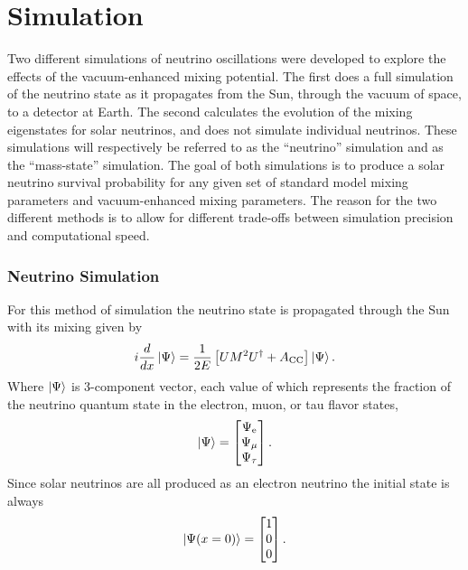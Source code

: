 \chapter{Simulation}
\label{sec:cham_sim}
Two different simulations of neutrino oscillations were developed to explore the
effects of the vacuum-enhanced mixing potential.
The first
does a full simulation of the neutrino state as it propagates from the
Sun, through the vacuum of space, to a detector at Earth.
The second calculates the evolution
of the mixing eigenstates for solar neutrinos, and does not simulate individual
neutrinos.
These simulations will respectively be referred to as the ``neutrino'' simulation
and as the ``mass-state'' simulation.
The goal of both simulations is to produce a solar neutrino survival probability
for any given set of standard model mixing parameters and vacuum-enhanced
mixing parameters.
The reason for the two different methods is to allow for different
trade-offs between simulation precision and computational speed.

\subsection{Neutrino Simulation}
For this method of simulation the neutrino state is propagated through the
Sun with its mixing given by
\begin{equation}
    i\frac{d}{dx}\ket{\Psi} =\frac{1}{2E}\left[UM^{2}U^{\dagger} + A_{\mathrm{CC}}\right]\ket{\Psi}\text{.}
    \label{eqn:mixing_schrodinger}
\end{equation}
Where $\ket{\Psi}$ is 3-component vector, each value of which represents
the fraction of the neutrino quantum state in the electron, muon, or tau flavor states,
\begin{equation}
\ket{\Psi} = 
\begin{bmatrix}
    \Psi_{\mathrm{e}}\\
    \Psi_{\mathrm{\mu}}\\
    \Psi_{\mathrm{\tau}}\\
\end{bmatrix}\mathrm{.}
\end{equation}
Since solar neutrinos are all produced as an electron neutrino the
initial state is always
\begin{equation}
\ket{\Psi(x=0)} = 
\begin{bmatrix}
1\\
0\\
0\\
\end{bmatrix}\mathrm{.}
\end{equation}

